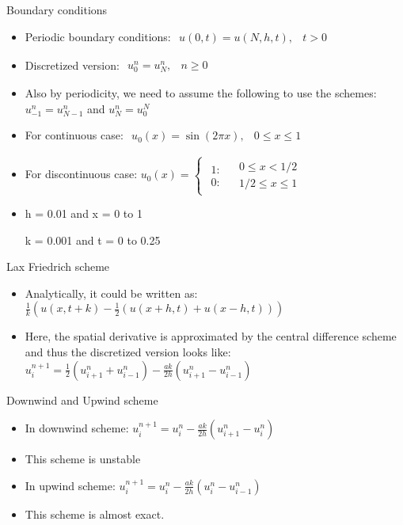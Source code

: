 \documentclass{beamer}
\begin{document}
\begin{frame}{Boundary conditions}
\begin{itemize}
\item {Periodic boundary conditions: $\begin{array}{cc}
u\left(0,t\right)=u\left(N,h,t\right), & t>0\end{array}$
}
\item {Discretized version: $\begin{array}{cc}
u_{0}^{n}=u_{N}^{n}, & n\geq0\end{array}$}
\item {Also by periodicity, we need to assume the following to use the schemes: $u_{-1}^{n}=u_{N-1}^{n}$ and $u_{N}^{n}=u_{0}^{N}$}
\item {For continuous case: $\begin{array}{cc}
u_{0}\left(x\right)=\sin\left(2\pi x\right), & 0\leq x\leq1\end{array}$
}
\item {For discontinuous case: $u_{0}\left(x\right)=\begin{cases}
\begin{array}{c}
1:\\
0:
\end{array} & \begin{array}{c}
0\leq x<1/2\\
1/2\leq x\leq1
\end{array}\end{cases}$}
\item {h = 0.01 and x = 0 to 1

k = 0.001 and t = 0 to 0.25}
\end{itemize}
\end{frame}

\begin{frame}{Lax Friedrich scheme}
\begin{itemize}
\item {Analytically, it could be written as: $\frac{1}{k}\left(u\left(x,t+k\right)-\frac{1}{2}\left(u\left(x+h,t\right)+u\left(x-h,t\right)\right)\right)$
}
\item {Here, the spatial derivative is approximated by the central difference scheme and thus the discretized version looks like: $u_{i}^{n+1}=\frac{1}{2}\left(u_{i+1}^{n}+u_{i-1}^{n}\right)-\frac{ak}{2h}\left(u_{i+1}^{n}-u_{i-1}^{n}\right)$}
\end{itemize}
\end{frame}

\begin{frame}{Downwind and Upwind scheme}
\begin{itemize}
\item {In downwind scheme: $u_{i}^{n+1}=u_{i}^{n}-\frac{ak}{2h}\left(u_{i+1}^{n}-u_{i}^{n}\right)$}
\item {This scheme is unstable}
\item {In upwind scheme: $u_{i}^{n+1}=u_{i}^{n}-\frac{ak}{2h}\left(u_{i}^{n}-u_{i-1}^{n}\right)$}
\item {This scheme is almost exact.}
\end{itemize}
\end{frame}
\end{document}
